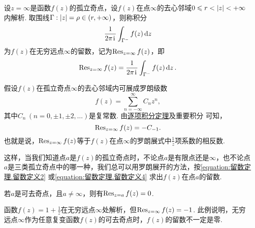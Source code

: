\begin{definition}
设\(z=\infty\)是函数\(f(z)\)的孤立奇点，设\(f(z)\)在点\(\infty\)的去心邻域\(0 \leqslant r < \abs{z} < +\infty\)内解析.
取围线\(\Gamma: \abs{z} = \rho\in(r,+\infty)\)，则称积分\[
\frac{1}{2\pi\kern1pt\mathrm{i}\kern1pt} \int_{\Gamma^-} f(z) \dd{z}
\]为\(f(z)\)在无穷远点\(\infty\)的留数，记为\(\operatorname{Res}_{z=\infty} f(z)\)，即\begin{equation}\label{equation:留数定理.留数定义3}
\operatorname{Res}_{z=\infty} f(z)
= \frac{1}{2\pi\kern1pt\mathrm{i}\kern1pt} \int_{\Gamma^-} f(z) \dd{z}.
\end{equation}
\end{definition}
假设\(f(z)\)在孤立奇点\(\infty\)的去心邻域内可展成罗朗级数\[
f(z) = \sum\limits_{n=-\infty}^{\infty} C_n z^n,
\]其中\(C_n\ (n=0,\pm1,\pm2,\dotsc)\)是复常数.
由\hyperref[theorem:解析函数的级数表示.一致收敛级数的基本性质2]{逐项积分定理}及重要积分  可知，\begin{equation}\label{equation:留数定理.留数定义4}
\operatorname{Res}_{z=\infty} f(z) = - C_{-1}.
\end{equation}
也就是说，\(\operatorname{Res}_{z=\infty} f(z)\)等于\(f(z)\)在点\(\infty\)的罗朗展式中\(\frac{1}{z}\)项系数的相反数.

这样，当我们知道点\(a\)是\(f(z)\)的孤立奇点时，不论点\(a\)是有限点还是\(\infty\)，也不论点\(a\)是三类孤立奇点中的哪一种，我们总可以用罗朗展开的方法，按\cref{equation:留数定理.留数定义2} 或\cref{equation:留数定理.留数定义4} 求出\(f(z)\)在点\(a\)的留数.

\begin{property}
若\(a\)是可去奇点，且\(a\neq\infty\)，则有\(\operatorname{Res}_{z=a} f(z) = 0\).
\end{property}

\begin{example}
函数\(f(z) = 1 + \frac{1}{z}\)在无穷远点\(\infty\)处解析，但\(\operatorname{Res}_{z=\infty} f(z) = -1\).
此例说明，无穷远点\(\infty\)作为任意复变函数\(f(z)\)的可去奇点时，\(f(z)\)的留数不一定是零.
\end{example}

